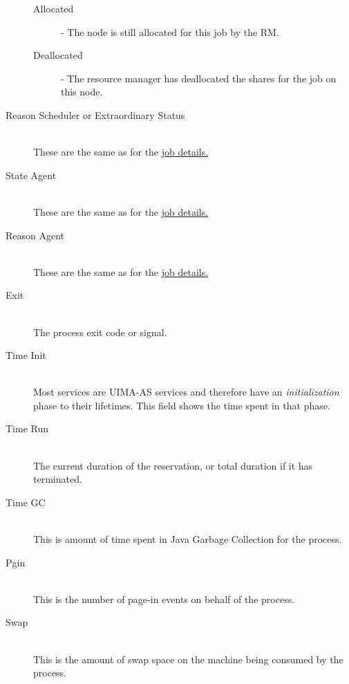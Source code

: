 \begin{description}
        \begin{description}
            \item[Allocated] - The node is still allocated for this job by the RM.
            \item[Deallocated] - The resource manager has deallocated the shares for the job on
              this node.
        \end{description}
        
      \item[Reason Scheduler or Extraordinary Status] \hfill \\
        These are the same as for the \hyperref[itm:job-details-sched]{job details.}

      \item[State Agent] \hfill \\
        These are the same as for the \hyperref[itm:job-details-state]{job details.}

      \item[Reason Agent] \hfill \\
        These are the same as for the \hyperref[itm:job-details-agent]{job details.}

      \item[Exit] \hfill \\
        The process exit code or signal.

      \item[Time Init] \hfill \\
        Most services are UIMA-AS services and therefore have an {\em initialization} phase
        to their lifetimes.  This field shows the time spent in that phase.

      \item[Time Run] \hfill \\
        The current duration of the reservation, or total duration if it has 
        terminated.
        
      \item[Time GC] \hfill \\
        This is amount of time spent in Java Garbage Collection for the process.

      \item[Pgin] \hfill \\
        This is the number of page-in events on behalf of the process.
        
      \item[Swap] \hfill \\
        This is the amount of swap space on the machine being consumed by the process.
        

\end{description}
